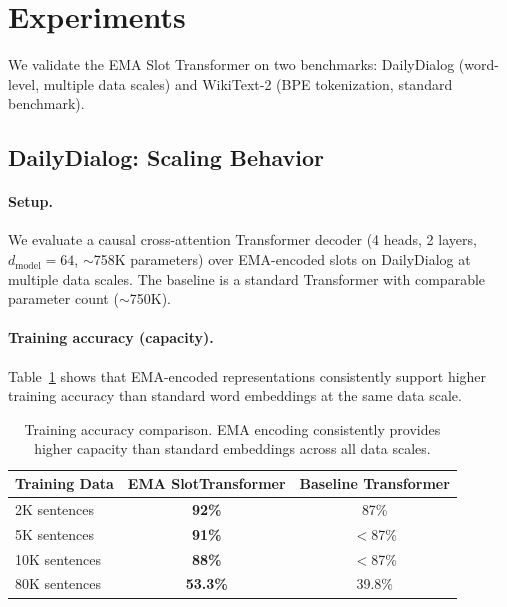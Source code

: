 \documentclass[11pt]{article}
\begin{document}
\section{Experiments}
\label{sec:experiments}

We validate the EMA Slot Transformer on two benchmarks: DailyDialog (word-level, multiple data scales) and WikiText-2 (BPE tokenization, standard benchmark).

\subsection{DailyDialog: Scaling Behavior}

\paragraph{Setup.} We evaluate a causal cross-attention Transformer decoder (4 heads, 2 layers, $d_{\text{model}} = 64$, $\sim$758K parameters) over EMA-encoded slots on DailyDialog at multiple data scales. The baseline is a standard Transformer with comparable parameter count ($\sim$750K).

\paragraph{Training accuracy (capacity).}
Table~\ref{tab:train_acc} shows that EMA-encoded representations consistently support higher training accuracy than standard word embeddings at the same data scale.

\begin{table}[t]
\centering
\begin{tabular}{l c c}
\toprule
Training Data & EMA SlotTransformer & Baseline Transformer \\
\midrule
2K sentences & \textbf{92\%} & 87\% \\
5K sentences & \textbf{91\%} & $<$87\% \\
10K sentences & \textbf{88\%} & $<$87\% \\
80K sentences & \textbf{53.3\%} & 39.8\% \\
\bottomrule
\end{tabular}
\caption{Training accuracy comparison. EMA encoding consistently provides higher capacity than standard embeddings across all data scales.}
\label{tab:train_acc}
\end{table}
\end{document}
